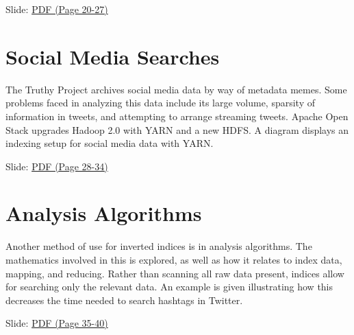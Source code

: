 
  Slide:
  \href{https://drive.google.com/open?id=0B88HKpainTSfWUh6dVNHcXloSnc}{PDF
  (Page 20-27)}

\section{Social Media Searches}

The Truthy Project archives social media data by way of metadata memes.
Some problems faced in analyzing this data include its large volume,
sparsity of information in tweets, and attempting to arrange streaming
tweets. Apache Open Stack upgrades Hadoop 2.0 with YARN and a new HDFS.
A diagram displays an indexing setup for social media data with YARN.


  Slide:
  \href{https://drive.google.com/open?id=0B88HKpainTSfWUh6dVNHcXloSnc}{PDF
  (Page 28-34)}

\section{Analysis Algorithms}

Another method of use for inverted indices is in analysis algorithms.
The mathematics involved in this is explored, as well as how it relates
to index data, mapping, and reducing. Rather than scanning all raw data
present, indices allow for searching only the relevant data. An example
is given illustrating how this decreases the time needed to search
hashtags in Twitter.


  Slide:
  \href{https://drive.google.com/open?id=0B88HKpainTSfWUh6dVNHcXloSnc}{PDF
  (Page 35-40)}

